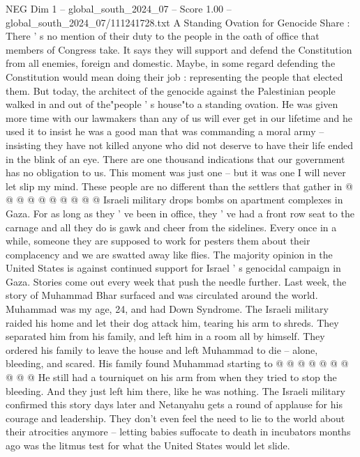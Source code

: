 \begin{textsample}{NEG Dim 1 – global\_south\_2024\_07 – Score 1.00 – global\_south\_2024\_07/111241728.txt}  \label{ex:f1_neg_392}
A Standing Ovation for Genocide Share : There ' s no mention of their duty to the people in the oath of office that members of Congress take.
It says they will support and defend the Constitution from all enemies, foreign and domestic.
Maybe, in some regard defending the Constitution would mean doing their job : representing the people that elected them.
But today, the architect of the genocide against the Palestinian people walked in and out of the"people ' s house"to a standing ovation.
He was given more time with our lawmakers than any of us will ever get in our lifetime and he used it to insist he was a good man that was commanding a moral army -- insisting they have not killed anyone who did not deserve to have their life ended in the blink of an eye.
There are one thousand indications that our government has no obligation to us.
This moment was just one -- but it was one I will never let slip my mind.
These people are no different than the settlers that gather in @ @ @ @ @ @ @ @ @ @ Israeli military drops bombs on apartment complexes in Gaza.
For as long as they ' ve been in office, they ' ve had a front row seat to the carnage and all they do is gawk and cheer from the sidelines.
Every once in a while, someone they are supposed to work for pesters them about their complacency and we are swatted away like flies.
The majority opinion in the United States is against continued support for Israel ' s genocidal campaign in Gaza.
Stories come out every week that push the needle further.
Last week, the story of Muhammad Bhar surfaced and was circulated around the world.
Muhammad was my age, 24, and had Down Syndrome.
The Israeli military raided his home and let their dog attack him, tearing his arm to shreds.
They separated him from his family, and left him in a room all by himself.
They ordered his family to leave the house and left Muhammad to die -- alone, bleeding, and scared.
His family found Muhammad starting to @ @ @ @ @ @ @ @ @ @ He still had a tourniquet on his arm from when they tried to stop the bleeding.
And they just left him there, like he was nothing.
The Israeli military confirmed this story days later and Netanyahu gets a round of applause for his courage and leadership.
They don't even feel the need to lie to the world about their atrocities anymore -- letting babies suffocate to death in incubators months ago was the litmus test for what the United States would let slide.

\end{textsample}
